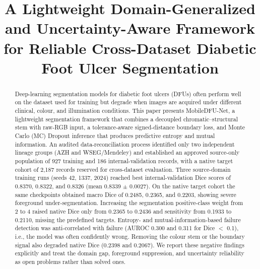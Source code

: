 \documentclass[conference]{IEEEtran}
\begin{document}
\title{A Lightweight Domain-Generalized and Uncertainty-Aware Framework for Reliable Cross-Dataset Diabetic Foot Ulcer Segmentation}

\author{
}

\maketitle

\begin{abstract}
Deep-learning segmentation models for diabetic foot ulcers (DFUs) often perform well on the dataset used for training but degrade when images are acquired under different clinical, colour, and illumination conditions. This paper presents MobileDFU-Net, a lightweight segmentation framework that combines a decoupled chromatic--structural stem with raw-RGB input, a tolerance-aware signed-distance boundary loss, and Monte Carlo (MC) Dropout inference that produces predictive entropy and mutual information. An audited data-reconciliation process identified only two independent lineage groups (AZH and WSEG/Mendeley) and established an approved source-only population of 927 training and 186 internal-validation records, with a native target cohort of 2,187 records reserved for cross-dataset evaluation. Three source-domain training runs (seeds 42, 1337, 2024) reached best internal-validation Dice scores of 0.8370, 0.8322, and 0.8326 (mean 0.8339 $\pm$ 0.0027). On the native target cohort the same checkpoints obtained macro Dice of 0.2485, 0.2365, and 0.2203, showing severe foreground under-segmentation. Increasing the segmentation positive-class weight from 2 to 4 raised native Dice only from 0.2365 to 0.2436 and sensitivity from 0.1933 to 0.2110, missing the predefined targets. Entropy- and mutual-information-based failure detection was anti-correlated with failure (AUROC 0.300 and 0.311 for Dice $<$ 0.1), i.e., the model was often confidently wrong. Removing the colour stem or the boundary signal also degraded native Dice (0.2398 and 0.2067). We report these negative findings explicitly and treat the domain gap, foreground suppression, and uncertainty reliability as open problems rather than solved ones.
\end{abstract}
\end{document}
